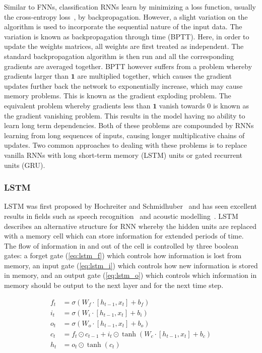 Similar to FNNs, classification RNNs learn by minimizing a loss function,
usually the cross-entropy loss~\cite{shore1980axiomatic}, by backpropagation.
However, a slight variation on the algorithm is used to incorporate the
sequential nature of the input data. The variation is known as backpropagation
through time (BPTT). Here, in order to update the weights matrices, all weights
are first treated as independent. The standard backpropagation algorithm is then
run and all the corresponding gradients are averaged together. BPTT however
suffers from a problem whereby gradients larger than $\mathbf{1}$ are multiplied
together, which causes the gradient updates further back the network to
exponentially increase, which may cause memory problems. This is known as the
gradient exploding problem. The equivalent problem whereby gradients less than
$\mathbf{1}$ vanish towards 0 is known as the gradient vanishing problem. This
results in the model having no ability to learn long term dependencies. Both of
these problems are compounded by RNNs learning from long sequences of inputs,
causing longer multiplicative chains of updates. Two common approaches to
dealing with these problems is to replace vanilla RNNs with long short-term
memory (LSTM) units or gated recurrent units (GRU).

\subsubsection{LSTM}

LSTM was first proposed by Hochreiter and Schmidhuber~\cite{hochreiter1997long}
and has seen excellent results in fields such as speech
recognition~\cite{he2016exploiting} and acoustic
modelling~\cite{qu2017syllable}. LSTM describes an alternative structure for RNN
whereby the hidden units are replaced with a memory cell which can store
information for extended periods of time. The flow of information in and out of
the cell is controlled by three boolean gates: a forget gate (\ref{eq:lstm_f})
which controls how information is lost from memory, an
input gate (\ref{eq:lstm_i}) which controls how new information is stored in
memory, and an output gate (\ref{eq:lstm_o}) which controls which information in
memory should be output to the next layer and for the next time step.

\begin{align}
  f_t &= \sigma(W_f \cdot \left[ h_{t-1},x_t \right] + b_f) \label{eq:lstm_f} \\[0.5em]
  i_t &= \sigma(W_i \cdot \left[ h_{t-1},x_t \right] + b_i) \label{eq:lstm_i} \\[0.5em]
  o_t &= \sigma(W_o \cdot \left[ h_{t-1},x_t \right] + b_o) \label{eq:lstm_o} \\[0.5em]
  c_t &= f_t \odot c_{t-1} + i_t \odot \tanh \left( 
    W_c \cdot \left[ h_{t-1},x_t \right] + b_c
  \right)  \\[0.5em]
  h_t &= o_t \odot \tanh (c_t)
\end{align}

